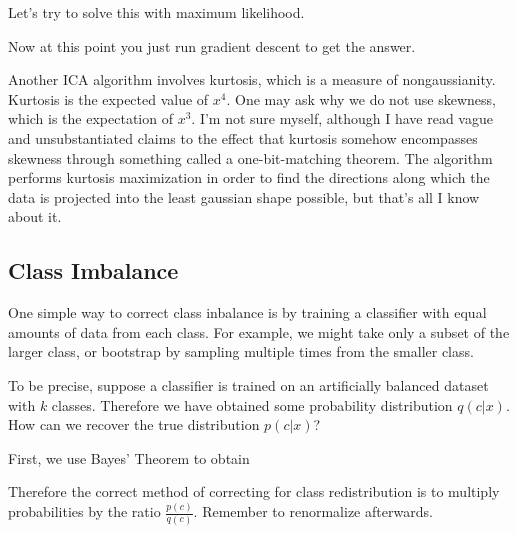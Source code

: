 \documentclass[12pt]{article}
\begin{document}
Let's try to solve this with maximum likelihood.


Now at this point you just run gradient descent to get the answer. 

Another ICA algorithm involves kurtosis, which is a measure of nongaussianity. Kurtosis is the expected value of $x^4$. One may ask why we do not use skewness, which is the expectation of $x^3$. I'm not sure myself, although I have read vague and unsubstantiated claims to the effect that kurtosis somehow encompasses skewness through something called a one-bit-matching theorem.
The algorithm performs kurtosis maximization in order to find the directions along which the data is projected into the least gaussian shape possible, but that's all I know about it.

\subsection{Class Imbalance}

One simple way to correct class inbalance is by training a classifier with equal amounts of data from each class. For example, we might take only a subset of the larger class, or bootstrap by sampling multiple times from the smaller class.

To be precise, suppose a classifier is trained on an artificially balanced dataset with $k$ classes. Therefore we have obtained some probability distribution $q(c|x)$. How can we recover the true distribution $p(c|x)$?

First, we use Bayes' Theorem to obtain

Therefore the correct method of correcting for class redistribution is to multiply probabilities by the ratio $\frac{p(c)}{q(c)}$. Remember to renormalize afterwards.
\end{document}
